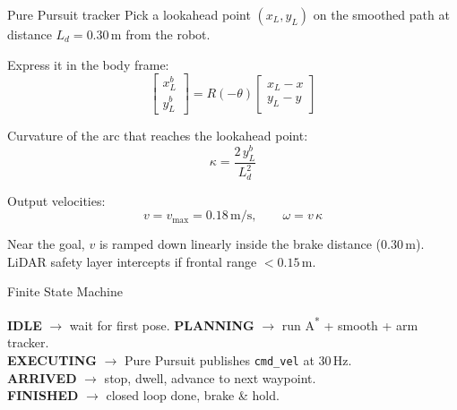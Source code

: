 \documentclass[10pt,aspectratio=169]{beamer}
\begin{document}
\begin{frame}{Pure Pursuit tracker}
  Pick a lookahead point $(x_L, y_L)$ on the smoothed path at distance
  $L_d = 0.30\,\text{m}$ from the robot.

  \medskip
  Express it in the body frame:
  \[
    \begin{bmatrix} x_L^b \\ y_L^b \end{bmatrix}
    = R(-\theta)
    \begin{bmatrix} x_L - x \\ y_L - y \end{bmatrix}
  \]

  Curvature of the arc that reaches the lookahead point:
  \[
    \kappa = \frac{2\, y_L^b}{L_d^2}
  \]

  Output velocities:
  \[
    v = v_{\max} = 0.18\,\text{m/s}, \qquad
    \omega = v\, \kappa
  \]

  \medskip
  Near the goal, $v$ is ramped down linearly inside the brake distance
  ($0.30\,\text{m}$). LiDAR safety layer intercepts if frontal range $< 0.15\,\text{m}$.
\end{frame}

\begin{frame}{Finite State Machine}
  \centering

  \medskip
  \small
  \textbf{IDLE} $\to$ wait for first pose. \quad
  \textbf{PLANNING} $\to$ run A\textsuperscript{*} + smooth + arm tracker. \\
  \textbf{EXECUTING} $\to$ Pure Pursuit publishes \texttt{cmd\_vel} at 30\,Hz. \\
  \textbf{ARRIVED} $\to$ stop, dwell, advance to next waypoint. \\
  \textbf{FINISHED} $\to$ closed loop done, brake \& hold.
\end{frame}
\end{document}
